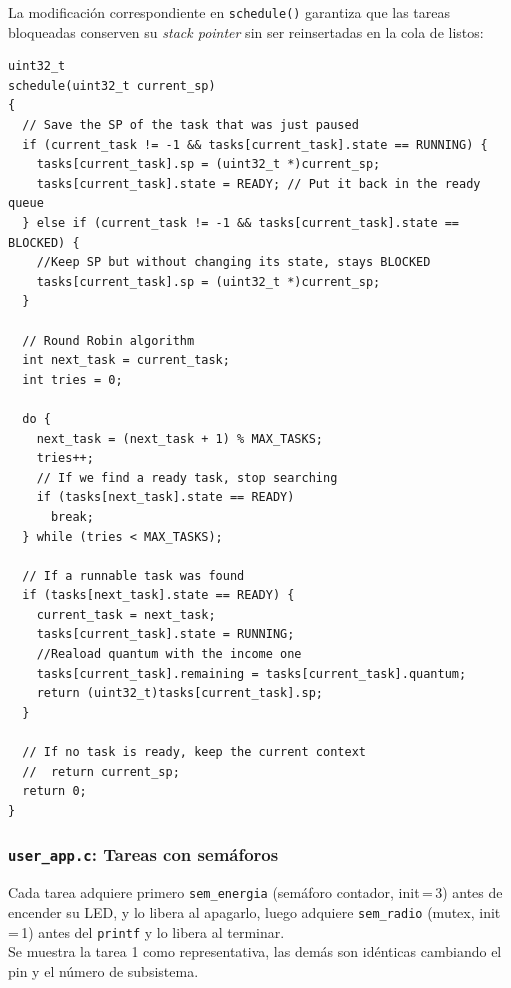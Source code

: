 \documentclass[12pt,letterpaper]{article}
\begin{document}
\bigskip

\noindent
La modificación correspondiente en \texttt{schedule()} garantiza que las tareas bloqueadas conserven su \textit{stack pointer} sin ser reinsertadas en la cola de listos:

\begin{lstlisting}[style=modernc, caption={\texttt{scheduler.c}, \texttt{schedule()} maneja el estado \texttt{BLOCKED}}]
uint32_t
schedule(uint32_t current_sp)
{
  // Save the SP of the task that was just paused
  if (current_task != -1 && tasks[current_task].state == RUNNING) {
    tasks[current_task].sp = (uint32_t *)current_sp;
    tasks[current_task].state = READY; // Put it back in the ready queue
  } else if (current_task != -1 && tasks[current_task].state == BLOCKED) {
    //Keep SP but without changing its state, stays BLOCKED
    tasks[current_task].sp = (uint32_t *)current_sp;
  }

  // Round Robin algorithm
  int next_task = current_task;
  int tries = 0;

  do {
    next_task = (next_task + 1) % MAX_TASKS;
    tries++;
    // If we find a ready task, stop searching
    if (tasks[next_task].state == READY)
      break;
  } while (tries < MAX_TASKS);
  
  // If a runnable task was found
  if (tasks[next_task].state == READY) {
    current_task = next_task;
    tasks[current_task].state = RUNNING;
    //Reaload quantum with the income one
    tasks[current_task].remaining = tasks[current_task].quantum;
    return (uint32_t)tasks[current_task].sp;
  }

  // If no task is ready, keep the current context
  //  return current_sp;
  return 0; 
}
\end{lstlisting}

\bigskip

\subsubsection*{\texttt{user\_app.c}: Tareas con semáforos}
Cada tarea adquiere primero \texttt{sem\_energia} (semáforo contador, init\,=\,3) antes de encender su LED, y lo libera al apagarlo, luego adquiere \texttt{sem\_radio} (mutex, init\,=\,1) antes del \texttt{printf} y lo libera al terminar.\\

Se muestra la tarea 1 como representativa, las demás son idénticas cambiando el pin y el número de subsistema.
\end{document}
